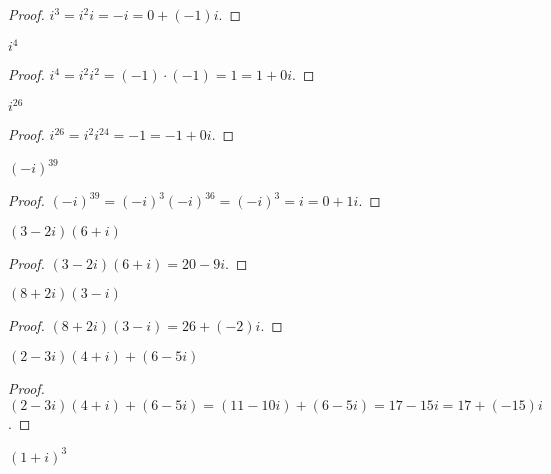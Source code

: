 \begin{proof}
    $i^{3} = {i}^{2}i = -i = 0 + (-1)i$.
\end{proof}

\begin{exercise}
    $i^{4}$
\end{exercise}

\begin{proof}
    $i^{4} = {i}^{2}{i}^{2} = (-1)\cdot (-1) = 1 = 1 + 0i$.
\end{proof}

\begin{exercise}
    $i^{26}$
\end{exercise}

\begin{proof}
    $i^{26} = {i}^{2}{i}^{24} = -1 = -1 + 0i$.
\end{proof}

\begin{exercise}
    ${(-i)}^{39}$
\end{exercise}

\begin{proof}
    ${(-i)}^{39} = {(-i)}^{3}{(-i)}^{36} = {(-i)}^{3} = i = 0 + 1i$.
\end{proof}

\begin{exercise}
    $(3 - 2i)(6 + i)$
\end{exercise}

\begin{proof}
    $(3 - 2i)(6 + i) = 20 - 9i$.
\end{proof}

\begin{exercise}
    $(8 + 2i)(3 - i)$
\end{exercise}

\begin{proof}
    $(8 + 2i)(3 - i) = 26 + (-2)i$.
\end{proof}

\begin{exercise}
    $(2 - 3i)(4 + i) + (6 - 5i)$
\end{exercise}

\begin{proof}
    $(2 - 3i)(4 + i) + (6 - 5i) = (11 - 10i) + (6 - 5i) = 17 - 15i = 17 + (-15)i$.
\end{proof}

\begin{exercise}
    ${(1+i)}^{3}$
\end{exercise}

